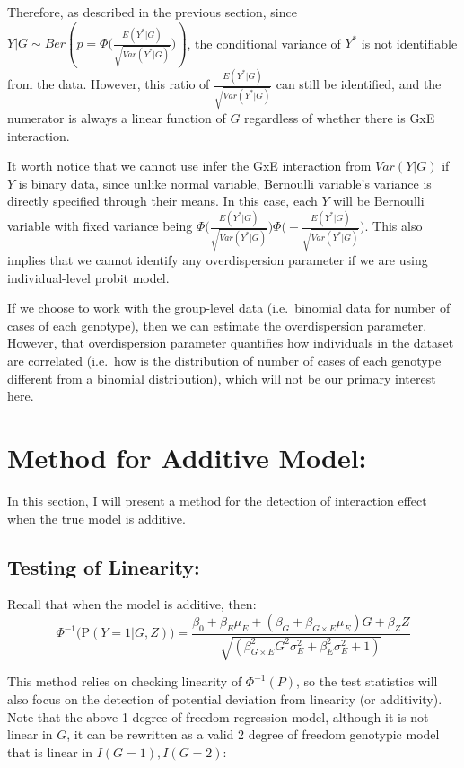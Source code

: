 \documentclass[
]{article}
\begin{document}
Therefore, as described in the previous section, since
\(Y|G \sim Ber(p=\Phi\big(\frac{E(Y^*|G)}{\sqrt{Var(Y^*|G)}}\big))\),
the conditional variance of \(Y^*\) is not identifiable from the data.
However, this ratio of \(\frac{E(Y^*|G)}{\sqrt{Var(Y^*|G)}}\) can still
be identified, and the numerator is always a linear function of \(G\)
regardless of whether there is GxE interaction.

It worth notice that we cannot use infer the GxE interaction from
\(Var(Y|G)\) if \(Y\) is binary data, since unlike normal variable,
Bernoulli variable's variance is directly specified through their means.
In this case, each \(Y\) will be Bernoulli variable with fixed variance
being
\(\Phi\big(\frac{E(Y^*|G)}{\sqrt{Var(Y^*|G)}}\big)\Phi\big(-\frac{E(Y^*|G)}{\sqrt{Var(Y^*|G)}}\big)\).
This also implies that we cannot identify any overdispersion parameter
if we are using individual-level probit model.

If we choose to work with the group-level data (i.e.~binomial data for
number of cases of each genotype), then we can estimate the
overdispersion parameter. However, that overdispersion parameter
quantifies how individuals in the dataset are correlated (i.e.~how is
the distribution of number of cases of each genotype different from a
binomial distribution), which will not be our primary interest here.

\clearpage

\hypertarget{method-for-additive-model}{%
\section{Method for Additive Model:}\label{method-for-additive-model}}

In this section, I will present a method for the detection of
interaction effect when the true model is additive.

\hypertarget{testing-of-linearity}{%
\subsection{Testing of Linearity:}\label{testing-of-linearity}}

Recall that when the model is additive, then:
\[\Phi^{-1} \bigg(\text{P}(Y = 1 | G, Z) \bigg) = \frac{\beta_0+\beta_E \mu_E+(\beta_G + \beta_{G\times E} \mu_E)G + \beta_Z Z}{\sqrt{(\beta_{G\times E}^2 G^2 \sigma_E^2 + \beta_E^2 \sigma_E^2 + 1)}}\]

This method relies on checking linearity of \(\Phi^{-1}(P)\), so the
test statistics will also focus on the detection of potential deviation
from linearity (or additivity). Note that the above 1 degree of freedom
regression model, although it is not linear in \(G\), it can be
rewritten as a valid 2 degree of freedom genotypic model that is linear
in \(I(G=1), I(G=2)\):
\end{document}
